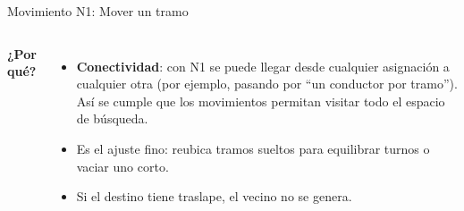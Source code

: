 \documentclass[aspectratio=169,10pt]{beamer}
\begin{document}
\begin{frame}{Movimiento N1: Mover un tramo}
\begin{columns}[T]
\textbf{¿Por qué?}
\begin{itemize}
\item \textbf{Conectividad}: con N1 se puede llegar desde cualquier asignación a cualquier otra (por ejemplo, pasando por ``un conductor por tramo''). Así se cumple que los movimientos permitan visitar todo el espacio de búsqueda.
\item Es el ajuste fino: reubica tramos sueltos para equilibrar turnos o vaciar uno corto.
\item Si el destino tiene traslape, el vecino no se genera.
\end{itemize}
\end{columns}
\end{frame}
\end{document}
